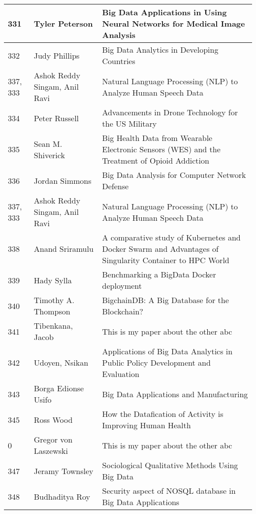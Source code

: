 \documentclass[12pt]{book}
\begin{document}
\begin{footnotesize}
\begin{longtable}{|p{1cm}p{5cm}p{9cm}|}
331 & Tyler Peterson & Big Data Applications in Using Neural Networks for Medical Image Analysis
  \\
\hline
332 & Judy Phillips & Big Data Analytics in Developing Countries  \\
\hline
337, 333 & Ashok Reddy Singam, Anil Ravi & Natural Language Processing (NLP) to Analyze Human Speech Data
  \\
\hline
334 & Peter Russell & Advancements in Drone Technology for the US Military  \\
\hline
335 & Sean M. Shiverick & Big Health Data from Wearable Electronic Sensors (WES) and the Treatment of Opioid Addiction
  \\
\hline
336 & Jordan Simmons & Big Data Analysis for Computer Network Defense  \\
\hline
337, 333 & Ashok Reddy Singam, Anil Ravi & Natural Language Processing (NLP) to Analyze Human Speech Data
  \\
\hline
338 & Anand Sriramulu & A comparative study of Kubernetes and Docker Swarm and Advantages of Singularity Container to HPC World  \\
\hline
339 & Hady Sylla & Benchmarking a BigData Docker deployment  \\
\hline
340 & Timothy A. Thompson & BigchainDB: A Big Database for the Blockchain?  \\
\hline
341 & Tibenkana, Jacob & This is my paper about the other abc  \\
\hline
342 & Udoyen, Nsikan & Applications of Big Data Analytics in Public Policy Development and Evaluation  \\
\hline
343 & Borga Edionse Usifo & Big Data Applications and Manufacturing  \\
\hline
345 & Ross Wood & How the Datafication of Activity is Improving Human Health  \\
\hline
0 & Gregor von Laszewski & This is my paper about the other abc  \\
\hline
347 & Jeramy Townsley & Sociological Qualitative Methods Using Big Data  \\
\hline
348 & Budhaditya Roy & Security aspect of NOSQL database in Big Data Applications  \\
\hline
\end{longtable}
\end{footnotesize}
\newpage
\end{document}

